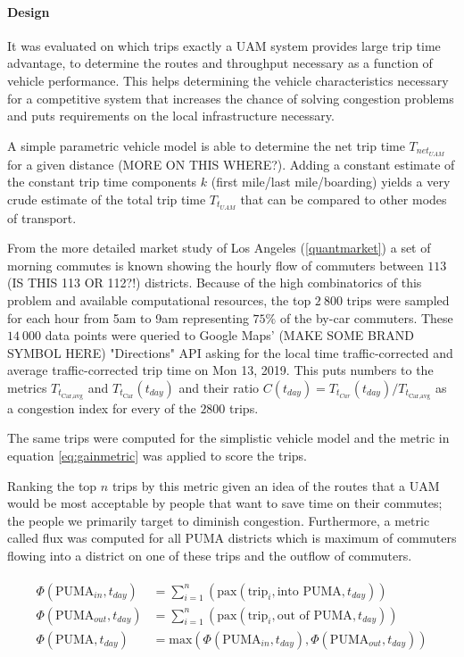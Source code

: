 \paragraph{Design}

It was evaluated on which trips exactly a UAM system provides large trip time advantage, to determine the routes and throughput necessary as a function of vehicle performance. This helps determining the vehicle characteristics necessary for a competitive system that increases the chance of solving congestion problems and puts requirements on the local infrastructure necessary.

A simple parametric vehicle model is able to determine the net trip time $T_{{net}_{UAM}}$ for a given distance (MORE ON THIS WHERE?). Adding a constant estimate of the constant trip time components $k$ (first mile/last mile/boarding) yields a very crude estimate of the total trip time $T_{{t}_{UAM}}$ that can be compared to other modes of transport.

From the more detailed market study of Los Angeles (\autoref{quantmarket}) a set of morning commutes is known showing the hourly flow of commuters between $113$ (IS THIS 113 OR 112?!) districts. Because of the high combinatorics of this problem and available computational resources, the top $2\ 800$ trips were sampled for each hour from 5am to 9am representing $75\%$ of the by-car commuters. These $14\ 000$ data points were queried to Google Maps' (MAKE SOME BRAND SYMBOL HERE) "Directions" API asking for the local time traffic-corrected and average traffic-corrected trip time on Mon 13, 2019. This puts numbers to the metrics $T_{t_{\text{Car},\text{avg} }}$ and $T_{t_{\text{Car} }}(t_{day})$ and their ratio $C(t_{day}) = T_{t_{Car}}(t_{day}) / T_{t_{\text{Car},\text{avg}} }$ as a congestion index for every of the $2800$ trips.

The same trips were computed for the simplistic vehicle model and the metric in equation \ref{eq:gainmetric} was applied to score the trips.

Ranking the top $n$ trips by this metric given an idea of the routes that a UAM would be most acceptable by people that want to save time on their commutes; the people we primarily target to diminish congestion. Furthermore, a metric called flux was computed for all PUMA districts which is maximum of commuters flowing into a district on one of these trips and the outflow of commuters.

\begin{align} \label{eq:PUMAflux}
    \begin{split}
    \Phi(\text{PUMA}_{in}, t_{day}) &= \sum_{i=1}^n{ \left( \text{pax}(\text{trip}_i, \text{into   PUMA}, t_{day})\right)}\\
    \Phi(\text{PUMA}_{out}, t_{day}) &= \sum_{i=1}^n{ \left( \text{pax}(\text{trip}_i, \text{out of PUMA}, t_{day})\right)}\\
    \Phi(\text{PUMA}, t_{day}) &= \text{max} 
    \left(
        \Phi(\text{PUMA}_{in}, t_{day}),
        \Phi(\text{PUMA}_{out}, t_{day})
    \right)
    \end{split}
\end{align}

